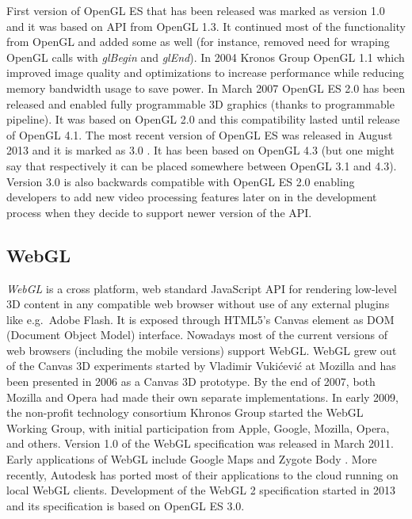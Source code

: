 First version of OpenGL ES that has been released was marked as version 1.0 and it was based on API from OpenGL 1.3.
It continued most of the functionality from OpenGL and added some as well (for instance, removed need for wraping OpenGL calls with \emph{glBegin} and \emph{glEnd}).
\newline In 2004 Kronos Group OpenGL 1.1 which improved image quality and optimizations to increase performance while reducing memory bandwidth usage to save power.
\newline In March 2007 OpenGL ES 2.0 has been released and enabled fully programmable 3D graphics (thanks to programmable pipeline).
It was based on OpenGL 2.0 and this compatibility lasted until release of OpenGL 4.1.
\newline The most recent version of OpenGL ES was released in August 2013 and it is marked as 3.0 \cite{opengl_es3_spec}.
It has been based on OpenGL 4.3 (but one might say that respectively it can be placed somewhere between OpenGL 3.1 and 4.3).
Version 3.0 is also backwards compatible with OpenGL ES 2.0 enabling developers to add new video processing features later on in the development process when they decide to support newer version of the API.

\subsection{WebGL}
\emph{WebGL} \cite{webgl_kronos} is a cross platform, web standard JavaScript API for rendering low-level 3D content in any compatible web browser without use of any external plugins like e.g.\ Adobe Flash.
It is exposed through HTML5's Canvas element as DOM (Document Object Model) interface.
Nowadays most of the current versions of web browsers (including the mobile versions) support WebGL.
WebGL grew out of the Canvas 3D experiments started by Vladimir Vukićević at Mozilla and has been presented in 2006 as a Canvas 3D prototype.
By the end of 2007, both Mozilla and Opera had made their own separate implementations.
In early 2009, the non-profit technology consortium Khronos Group started the WebGL Working Group, with initial participation from Apple, Google, Mozilla, Opera, and others.
Version 1.0 of the WebGL specification was released in March 2011.
Early applications of WebGL include Google Maps and Zygote Body \cite{zygote_body}.
More recently, Autodesk has ported most of their applications to the cloud running on local WebGL clients.
Development of the WebGL 2 specification started in 2013 and its specification is based on OpenGL ES 3.0.

